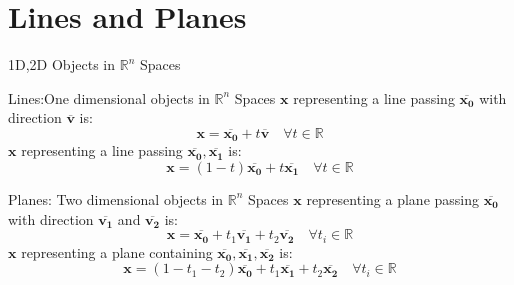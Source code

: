 \documentclass[a4paper,11pt]{article}
\begin{document}
\section{Lines and Planes} %
\label{sec:lines}
\begin{frame}[t]{1D,2D Objects in $\mathbb{R}^n$ Spaces}
	\begin{block}
		{Lines:One dimensional objects in $\mathbb{R}^n$ Spaces}
		$\mathbf{x}$ representing a line passing $\overline{\mathbf{x_0}}$ with direction $\overline{\mathbf{v}}$ is:\[
			\mathbf{x} = \overline{\mathbf{x_0}}+t\overline{\mathbf{v}}\quad \forall t\in\mathbb{R} \tag{Parametric Representation}
		\]
		$\mathbf{x}$ representing a line passing $\overline{\mathbf{x_0}},\overline{\mathbf{x_1}}$ is: \[
			\mathbf{x} = (1-t)\overline{\mathbf{x_0}}+t\overline{\mathbf{x_1}}\quad\forall t\in\mathbb{R} \tag{Parametric Representation}
		\]
	\end{block}
	\begin{block}
		{Planes: Two dimensional objects in $\mathbb{R}^n$ Spaces}
		$\mathbf{x}$ representing a plane  passing $\overline{\mathbf{x_0}}$ with direction $\overline{\mathbf{v_1}}$ and $\overline{\mathbf{v_2}}$ is:\[
			\mathbf{x} = \overline{\mathbf{x_0}}+t_1\overline{\mathbf{v_1}}+t_2\overline{\mathbf{v_2}}\quad \forall t_i\in\mathbb{R} \tag{Parametric Representation}
		\]
		$\mathbf{x}$ representing a plane containing $\overline{\mathbf{x_0}},\overline{\mathbf{x_1}},\overline{\mathbf{x_2}}$ is: \[
			\mathbf{x} = (1-t_1-t_2)\overline{\mathbf{x_0}}+t_1\overline{\mathbf{x_1}}+t_2\overline{\mathbf{x_2}}\quad\forall t_i\in\mathbb{R} \tag{Parametric Representation}
		\]
	\end{block}
\end{frame}
\end{document}
